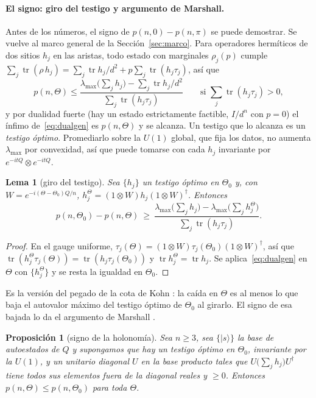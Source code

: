 \documentclass[11pt,a4paper]{article}
\newtheorem{lema}[teorema]{Lema}
\newtheorem{proposicion}[teorema]{Proposición}
\theoremstyle{remark}
\newcommand{\tr}{\operatorname{tr}}
\newcommand{\ket}[1]{|#1\rangle}
\begin{document}
\paragraph{El signo: giro del testigo y argumento de Marshall.} Antes de los números, el signo de
$p(n,0)-p(n,\pi)$ se puede demostrar. Se vuelve al marco general de la Sección~\ref{sec:marco}. Para
operadores hermíticos de dos sitios $h_j$ en las aristas, todo estado con marginales $\rho_j(p)$
cumple $\sum_j\tr(\rho\,h_j)=\sum_j\tr h_j/d^2+p\sum_j\tr(h_j\tau_j)$, así que
\begin{equation}\label{eq:dualgen}
  p(n,\Theta)\le\frac{\lambda_{\max}\big(\sum_jh_j\big)-\sum_j\tr h_j/d^2}{\sum_j\tr(h_j\tau_j)}
  \qquad\text{si }\textstyle\sum_j\tr(h_j\tau_j)>0,
\end{equation}
y por dualidad fuerte (hay un estado estrictamente factible, $I/d^n$ con $p=0$) el ínfimo
de~\eqref{eq:dualgen} es $p(n,\Theta)$ y se alcanza. Un testigo que lo alcanza es un \emph{testigo
óptimo}. Promediarlo sobre la $U(1)$ global, que fija los datos, no aumenta $\lambda_{\max}$ por
convexidad, así que puede tomarse con cada $h_j$ invariante por $e^{-itQ}\otimes e^{-itQ}$.

\begin{lema}[giro del testigo]\label{lem:giro}
Sea $\{h_j\}$ un testigo óptimo en $\Theta_0$ y, con $W=e^{-i(\Theta-\Theta_0)Q/n}$,
$h_j^\Theta=(1\otimes W)h_j(1\otimes W)^\dagger$. Entonces
\[
  p(n,\Theta_0)-p(n,\Theta)\ \ge\
  \frac{\lambda_{\max}\big(\sum_jh_j\big)-\lambda_{\max}\big(\sum_jh^\Theta_j\big)}{\sum_j\tr(h_j\tau_j)} .
\]
\end{lema}

\begin{proof}
En el gauge uniforme, $\tau_j(\Theta)=(1\otimes W)\tau_j(\Theta_0)(1\otimes W)^\dagger$, así que
$\tr(h^\Theta_j\tau_j(\Theta))=\tr(h_j\tau_j(\Theta_0))$ y $\tr h^\Theta_j=\tr h_j$. Se
aplica~\eqref{eq:dualgen} en $\Theta$ con $\{h^\Theta_j\}$ y se resta la igualdad en $\Theta_0$.
\end{proof}

Es la versión del pegado de la cota de Kohn \cite{kohn}: la caída en $\Theta$ es al menos lo que
baja el autovalor máximo del testigo óptimo de $\Theta_0$ al girarlo. El signo de esa bajada lo da el
argumento de Marshall \cite{marshall}.

\begin{proposicion}[signo de la holonomía]\label{prop:marshall}
Sea $n\ge3$, sea $\{\ket s\}$ la base de autoestados de $Q$ y supongamos que hay un testigo óptimo en
$\Theta_0$, invariante por la $U(1)$, y un unitario diagonal $U$ en la base producto tales que
$U\big(\sum_jh_j\big)U^\dagger$ tiene todos sus elementos fuera de la diagonal reales y $\ge0$.
Entonces $p(n,\Theta)\le p(n,\Theta_0)$ para toda $\Theta$.
\end{proposicion}
\end{document}
